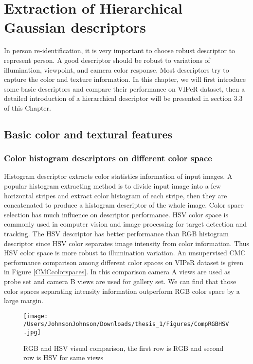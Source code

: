 \chapter{Extraction of Hierarchical Gaussian descriptors}
In person re-identification, it is very important to choose robust descriptor to represent person. A good descriptor should be robust to variations of illumination, viewpoint, and camera color response. Most descriptors try to capture the color and texture information. In this chapter, we will first introduce some basic descriptors and compare their performance on VIPeR dataset, then a detailed introduction of a hierarchical descriptor will be presented in section 3.3 of this Chapter.


\section{Basic color and textural features}
\subsection{Color histogram descriptors on different color space}
Histogram descriptor extracts color statistics information of input images. A popular histogram extracting method is to divide input image into a few horizontal stripes and extract color histogram of each stripe, then they are concatenated to produce a histogram descriptor of the whole image. Color space selection has much influence on descriptor performance. HSV color space is commonly used in computer vision and image processing for target detection and tracking. The HSV descriptor has better performance than RGB histogram descriptor since HSV color separates image intensity from color information. Thus HSV color space is more robust to illumination variation. An unsupervised CMC performance comparison among different color spaces on VIPeR dataset is given in Figure \ref{CMCcolorspaces}. In this comparison camera A views are used as probe set and camera B views are used for gallery set. We can find that those color spaces separating intensity information outperform RGB color space by a large margin.

\begin{figure}[H]
\centering
\texttt{[image: /Users/JohnsonJohnson/Downloads/thesis\_1/Figures/CompRGBHSV.jpg]}
\caption{RGB and HSV visual comparison, the first row is RGB and second row is HSV for same views }
\vspace{0em}
\end{figure} 


